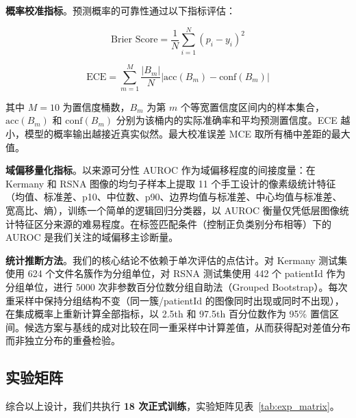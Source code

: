 \documentclass[12pt,a4paper,UTF8,openany]{ctexbook}
\begin{document}
\textbf{概率校准指标}。预测概率的可靠性通过以下指标评估：

\begin{equation}
\text{Brier Score} = \frac{1}{N}\sum_{i=1}^{N}(p_i - y_i)^2
\end{equation}

\begin{equation}
\text{ECE} = \sum_{m=1}^{M}\frac{|B_m|}{N}\left|\text{acc}(B_m) - \text{conf}(B_m)\right|
\end{equation}

其中 $M=10$ 为置信度桶数，$B_m$ 为第 $m$ 个等宽置信度区间内的样本集合，$\text{acc}(B_m)$ 和 $\text{conf}(B_m)$ 分别为该桶内的实际准确率和平均预测置信度。ECE 越小，模型的概率输出越接近真实似然。最大校准误差 MCE 取所有桶中差距的最大值。

\textbf{域偏移量化指标}。以来源可分性 AUROC 作为域偏移程度的间接度量：在 Kermany 和 RSNA 图像的均匀子样本上提取 11 个手工设计的像素级统计特征（均值、标准差、p10、中位数、p90、边界均值与标准差、中心均值与标准差、宽高比、熵），训练一个简单的逻辑回归分类器，以 AUROC 衡量仅凭低层图像统计特征区分来源的难易程度。在标签匹配条件（控制正负类别分布相等）下的 AUROC 是我们关注的域偏移主诊断量。

\textbf{统计推断方法}。我们的核心结论不依赖于单次评估的点估计。对 Kermany 测试集使用 624 个文件名簇作为分组单位，对 RSNA 测试集使用 442 个 patientId 作为分组单位，进行 5000 次非参数百分位数分组自助法（Grouped Bootstrap）。每次重采样中保持分组结构不变（同一簇/patientId 的图像同时出现或同时不出现），在集成概率上重新计算全部指标，以 2.5th 和 97.5th 百分位数作为 95\% 置信区间。候选方案与基线的成对比较在同一重采样中计算差值，从而获得配对差值分布而非独立分布的重叠检验。

\subsection{实验矩阵}

综合以上设计，我们共执行 \textbf{18 次正式训练}，实验矩阵见表~\ref{tab:exp_matrix}。
\end{document}
